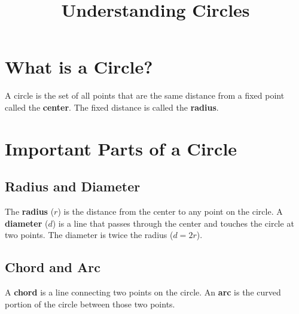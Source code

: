 \documentclass[12pt]{article}
\title{Understanding Circles}
\author{}
\date{}
\begin{document}
\maketitle
\tableofcontents

\section{What is a Circle?}
A circle is the set of all points that are the same distance from a fixed point called the \textbf{center}. The fixed distance is called the \textbf{radius}.

\begin{center}
\end{center}

\section{Important Parts of a Circle}
\subsection{Radius and Diameter}
The \textbf{radius} ($r$) is the distance from the center to any point on the circle. A \textbf{diameter} ($d$) is a line that passes through the center and touches the circle at two points. The diameter is twice the radius ($d = 2r$).

\begin{center}
\end{center}

\subsection{Chord and Arc}
A \textbf{chord} is a line connecting two points on the circle. An \textbf{arc} is the curved portion of the circle between those two points.

\begin{center}
\end{center}
\end{document}
